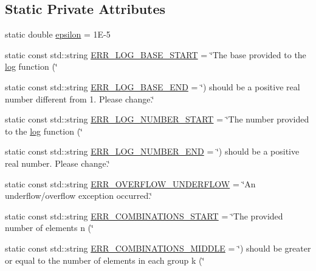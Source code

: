 \subsection*{Static Private Attributes}
\begin{DoxyCompactItemize}
\item 
static double \hyperlink{classmultiscale_1_1Numeric_ac66cc2092ff149af068ac93aa3a6cc51}{epsilon} = 1\-E-\/5
\item 
static const std\-::string \hyperlink{classmultiscale_1_1Numeric_a551052e6be615efea82ea046ba178010}{E\-R\-R\-\_\-\-L\-O\-G\-\_\-\-B\-A\-S\-E\-\_\-\-S\-T\-A\-R\-T} = \char`\"{}The base provided to the \hyperlink{classmultiscale_1_1Numeric_a27b50deac29d8aca5c41c8b19fba43e9}{log} function (\char`\"{}
\item 
static const std\-::string \hyperlink{classmultiscale_1_1Numeric_a291c98ea0c6e6c4042fe9ecc4af0443a}{E\-R\-R\-\_\-\-L\-O\-G\-\_\-\-B\-A\-S\-E\-\_\-\-E\-N\-D} = \char`\"{}) should be a positive real number different from 1. Please change.\char`\"{}
\item 
static const std\-::string \hyperlink{classmultiscale_1_1Numeric_a88ca9309ade745700dacbdc7c0d713f2}{E\-R\-R\-\_\-\-L\-O\-G\-\_\-\-N\-U\-M\-B\-E\-R\-\_\-\-S\-T\-A\-R\-T} = \char`\"{}The number provided to the \hyperlink{classmultiscale_1_1Numeric_a27b50deac29d8aca5c41c8b19fba43e9}{log} function (\char`\"{}
\item 
static const std\-::string \hyperlink{classmultiscale_1_1Numeric_a2f61b82d42049e175a8d34cd75966c6c}{E\-R\-R\-\_\-\-L\-O\-G\-\_\-\-N\-U\-M\-B\-E\-R\-\_\-\-E\-N\-D} = \char`\"{}) should be a positive real number. Please change.\char`\"{}
\item 
static const std\-::string \hyperlink{classmultiscale_1_1Numeric_aa56bde8322d97ccc99c252b951d44a9d}{E\-R\-R\-\_\-\-O\-V\-E\-R\-F\-L\-O\-W\-\_\-\-U\-N\-D\-E\-R\-F\-L\-O\-W} = \char`\"{}An underflow/overflow exception occurred.\char`\"{}
\item 
static const std\-::string \hyperlink{classmultiscale_1_1Numeric_a0de8a663c81ef3b50fba84645eab6e7d}{E\-R\-R\-\_\-\-C\-O\-M\-B\-I\-N\-A\-T\-I\-O\-N\-S\-\_\-\-S\-T\-A\-R\-T} = \char`\"{}The provided number of elements n (\char`\"{}
\item 
static const std\-::string \hyperlink{classmultiscale_1_1Numeric_a0228a04871361c5e0dc8d90c53eed803}{E\-R\-R\-\_\-\-C\-O\-M\-B\-I\-N\-A\-T\-I\-O\-N\-S\-\_\-\-M\-I\-D\-D\-L\-E} = \char`\"{}) should be greater or equal to the number of elements in each group k (\char`\"{}
\item 

\end{DoxyCompactItemize}
